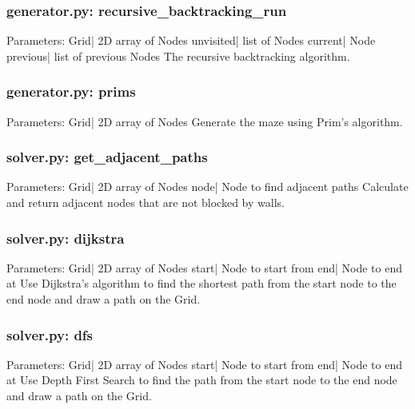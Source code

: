 \documentclass[titlepage]{article}
\begin{document}
\subsubsection{generator.py: recursive\_backtracking\_run}
Parameters:\newline
\indent Grid| 2D array of Nodes\newline
\indent unvisited| list of Nodes\newline
\indent current| Node\newline
\indent previous| list of previous Nodes\newline
The recursive backtracking algorithm.

\subsubsection{generator.py: prims}
Parameters:\newline
\indent Grid| 2D array of Nodes\newline
Generate the maze using Prim's algorithm.

\subsubsection{solver.py: get\_adjacent\_paths}
Parameters:\newline
\indent Grid| 2D array of Nodes\newline
\indent node| Node to find adjacent paths\newline
Calculate and return adjacent nodes that are not blocked by walls.

\subsubsection{solver.py: dijkstra}
Parameters:\newline
\indent Grid| 2D array of Nodes\newline
\indent start| Node to start from\newline
\indent end| Node to end at\newline
Use Dijkstra's algorithm to find the shortest path from the start node to the end node and draw a path on the Grid.

\subsubsection{solver.py: dfs}
Parameters:\newline
\indent Grid| 2D array of Nodes\newline
\indent start| Node to start from\newline
\indent end| Node to end at\newline
Use Depth First Search to find the path from the start node to the end node and draw a path on the Grid.
\end{document}
